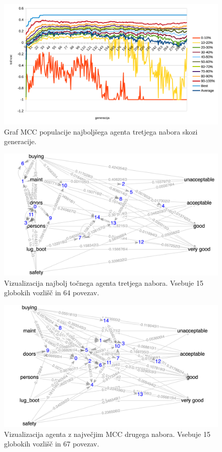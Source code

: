 \begin{figure}[H]
    \begin{center}
        \includegraphics[width=13cm]{car/3/mcc}
    \end{center}
    \caption{Graf MCC populacije najboljšega agenta tretjega nabora skozi generacije.}
    \label{fig:car_mcc_3}
\end{figure}

\begin{figure}[H]
    \begin{center}
        \includegraphics[width=13cm]{car/3/acc_g}
    \end{center}
    \caption{Vizualizacija najbolj točnega agenta tretjega nabora. Vsebuje 15 globokih vozlišč in 64 povezav.}
    \label{fig:car_acc_3_g}
\end{figure}

\begin{figure}[H]
    \begin{center}
        \includegraphics[width=13cm]{car/3/mcc_g}
    \end{center}
    \caption{Vizualizacija agenta z največjim MCC drugega nabora. Vsebuje 15 globokih vozlišč in 67 povezav.}
    \label{fig:car_mcc_3_g}
\end{figure}